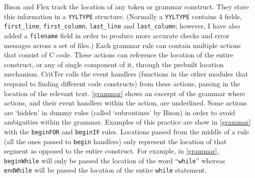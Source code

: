 \documentclass[12pt]{report}
\newcommand{\programName}{CritTer\xspace}
\begin{document}
Bison and Flex track the location of any token or grammar construct. They store this information in a 
\lstinline{YYLTYPE} structure. (Normally a \lstinline{YYLTYPE} contains 4 fields, \lstinline{first_line}, 
\lstinline{first_column}, \lstinline{last_line} and \lstinline{last_column}; however, I have also added a 
\lstinline{filename} field in order to produce more accurate checks and error messages across a set of 
files.) Each grammar rule can contain multiple actions that consist of C code. These actions can 
reference the location of the entire construct, or any of single component of it, through the prebuilt 
location mechanism. \programName calls the event handlers (functions in the other modules that 
respond to finding different code constructs) from these actions, passing in the location of the relevant 
text.  \autoref{grammar} shows an excerpt of the grammar where actions, and their event handlers within 
the action, are underlined. Some actions are `hidden' in dummy rules (called `subroutines' by Bison) in 
order to avoid ambiguities within the grammar. Examples of this practice are show in \autoref{grammar} 
with the \lstinline{beginFOR} and \lstinline{beginIF} rules. Locations passed from the middle of a rule (all 
the ones passed to \lstinline{begin} handlers) only represent the location of that segment as opposed to 
the entire construct. For example, in \autoref{grammar}, \lstinline{beginWhile} will only be passed the 
location of the word ``\lstinline{while}'' whereas \lstinline{endWhile} will be passed the location of the 
entire \lstinline{while} statement.
\end{document}
